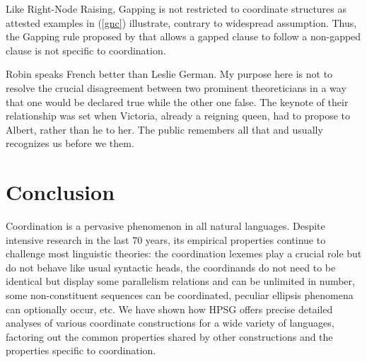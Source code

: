 \begin{figure}
\centering
{}
\end{figure}


Like Right-Node Raising, Gapping is not restricted to coordinate structures as  attested 
examples in (\ref{gnc}) illustrate, contrary to widespread assumption.   Thus, the Gapping rule
proposed by \citet[]{sangheepark} that allows a gapped clause to follow a non-gapped clause is not
specific to coordination.

\eal
\label{gnc}
\ex Robin speaks French better than Leslie \trace{} German.
\ex My purpose here is not to resolve the crucial disagreement between two prominent theoreticians in a way that one would be declared true while the other one \trace{} false.
\ex The keynote of their relationship was set when Victoria, already a reigning queen,
had to propose to Albert, rather than he \trace{} to her.
\ex The public remembers all that and usually recognizes us before we \trace{} them.
\zl




\section{Conclusion}

Coordination is a pervasive phenomenon in all natural languages. Despite intensive research in the
last 70 years, its empirical properties continue to challenge most linguistic theories: the
coordination lexemes play a crucial role but do not behave like usual syntactic heads, the
coordinands do not need to be identical but display some parallelism relations and can be unlimited
in number, some non-constituent sequences can be coordinated, peculiar ellipsis phenomena can
optionally occur, etc. We have shown how HPSG offers precise detailed analyses of various coordinate
constructions for a wide variety of languages, factoring out the common properties shared by other
constructions and the properties specific to coordination.

